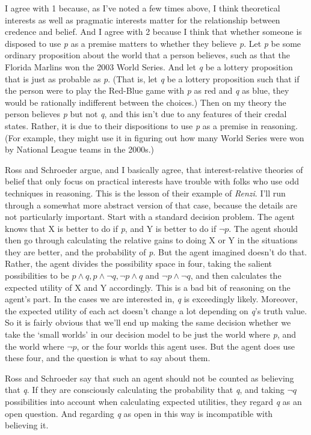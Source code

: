 \documentclass[11pt,]{book}
\begin{document}
I agree with 1 because, as I've noted a few times above, I think theoretical interests as well as pragmatic interests matter for the relationship between credence and belief. And I agree with 2 because I think that whether someone is disposed to use \emph{p} as a premise matters to whether they believe \emph{p}. Let \emph{p} be some ordinary proposition about the world that a person believes, such as that the Florida Marlins won the 2003 World Series. And let \emph{q} be a lottery proposition that is just as probable as \emph{p}. (That is, let \emph{q} be a lottery proposition such that if the person were to play the Red-Blue game with \emph{p} as red and \emph{q} as blue, they would be rationally indifferent between the choices.) Then on my theory the person believes \emph{p} but not \emph{q}, and this isn't due to any features of their credal states. Rather, it is due to their dispositions to use \emph{p} as a premise in reasoning. (For example, they might use it in figuring out how many World Series were won by National League teams in the 2000s.)

Ross and Schroeder argue, and I basically agree, that interest-relative theories of belief that only focus on practical interests have trouble with folks who use odd techniques in reasoning. This is the lesson of their example of \emph{Renzi}. I'll run through a somewhat more abstract version of
that case, because the details are not particularly important. Start with a standard decision problem. The agent knows that X is better to do if \emph{p}, and Y is better to do if \(\neg p\). The agent should then go through calculating the relative gains to doing X or Y in the situations they are better, and the probability of \emph{p}. But the agent imagined doesn't do that. Rather, the agent divides the possibility space in four, taking the salient possibilities to be
\(p \wedge q, p \wedge \neg q, \neg p \wedge q\) and \(\neg p \wedge \neg q\), and then calculates the expected utility of X and Y accordingly. This is a bad bit of reasoning on the agent's part. In the cases we are interested in, \emph{q} is exceedingly likely. Moreover, the expected utility of each act doesn't change a lot depending on \emph{q}'s truth value. So it is fairly obvious that we'll end up making the same decision whether we take the `small worlds' in our decision model to be just the world where \emph{p}, and the world where \(\neg p\), or the four worlds this agent uses. But the agent does use these four, and the question is what to say about them.

Ross and Schroeder say that such an agent should not be counted as believing that \emph{q}. If they are consciously calculating the probability that \emph{q}, and taking \(\neg q\) possibilities into account when calculating expected utilities, they regard \emph{q} as an open question. And regarding \emph{q} as open in this way is incompatible with believing it.
\end{document}
